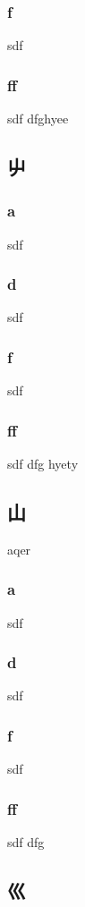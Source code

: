 \subsubsection{f}sdf
\subsubsection{ff}sdf
\setcounter{subsss}{\value{subsubsection}} dfghyee
\subsection{\ene  屮} \label{cuarentaycincos}  %

\subsubsection{a}sdf
\subsubsection{d}sdf
\subsubsection{f}sdf
\subsubsection{ff}sdf
\setcounter{subsss}{\value{subsubsection}} dfg
hyety
\subsection{\ene  山} \label{cuarentayseiss}aqer

\subsubsection{a}sdf
\subsubsection{d}sdf
\subsubsection{f}sdf
\subsubsection{ff}sdf
\setcounter{subsss}{\value{subsubsection}} dfg
\subsection{\ene  巛} \label{cuarentaysietes} 

